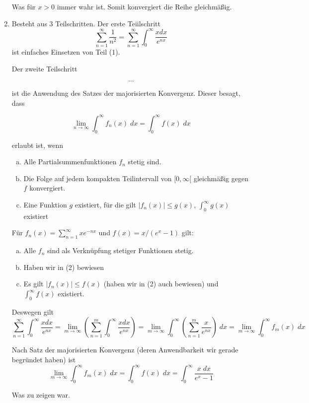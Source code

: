 \documentclass[a4paper,german,12pt,smallheadings]{scrartcl}
\begin{document}
\begin{enumerate}[(1)]
  Was für $x > 0$ immer wahr ist. Somit konvergiert die Reihe gleichmäßig.

  \item 
  Besteht aus 3 Teilschritten.
  Der erste Teiilschritt 
  \begin{equation*}
    \sum_{n=1}^{\infty}\frac{1}{n^2}=\sum_{n=1}^{\infty}\int_{0}^{\infty}\frac{xdx}{e^{nx}}
  \end{equation*}
  ist einfaches Einsetzen von Teil (1).

  Der zweite Teilschritt

  \begin{equation*}
    \dots %
  \end{equation*}

  ist die Anwendung des Satzes der majorisierten Konvergenz. Dieser besagt, dass

  \begin{equation*}
    \lim_{n \to \infty} \int_0^\infty f_n(x) \; dx = \int_0^\infty f(x) \; dx
  \end{equation*}

  erlaubt ist, wenn
  \begin{enumerate}[a)]
    \item Alle Partialsummenfunktionen $f_n$ stetig sind.
    \item Die Folge auf jedem kompakten Teilintervall von $[0,\infty[$ gleichmäßig gegen $f$ konvergiert.
    \item Eine Funktion $g$ existiert, für die gilt $|f_n(x)| \le g(x)$, $\int_0^\infty g(x)$ existiert
  \end{enumerate}

  Für $f_n(x) = \sum_{n=1}^\infty xe^{-nx}$ und $f(x) = x/(e^x - 1)$ gilt:
  \begin{enumerate}[a)]
    \item Alle $f_n$ sind als Verknüpfung stetiger Funktionen stetig.
    \item Haben wir in (2) bewiesen
    \item Es gilt $|f_n(x)| \le f(x)$ (haben wir in (2) auch bewiesen) und $\int_0^\infty f(x)$ existiert.
  \end{enumerate}

  Deswegen gilt
  \begin{equation*}
    \sum_{n=1}^{\infty}\int_{0}^{\infty}\frac{xdx}{e^{nx}}
    =\lim\limits_{m \to \infty}\left(\sum_{n=1}^{m}\int_{0}^{\infty}\frac{xdx}{e^{nx}}\right)
    =\lim\limits_{m \to \infty} \int_{0}^{\infty} \left(\sum_{n=1}^{m}\frac{x}{e^{nx}}\right) \; dx
    =\lim\limits_{m \to \infty} \int_{0}^{\infty} f_m(x) \; dx
  \end{equation*}

  Nach Satz der majorisierten Konvergenz (deren Anwendbarkeit wir gerade begründet haben) ist
  \begin{equation*}
    \lim\limits_{m \to \infty} \int_{0}^{\infty} f_m(x) \; dx = \int_0^\infty f(x) \; dx = \int_0^\infty \frac{x \; dx}{e^x-1}
  \end{equation*}

  Was zu zeigen war.
\end{enumerate}
\end{document}
